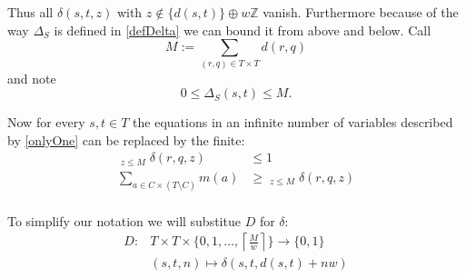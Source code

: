 \documentclass[a4paper]{amsart} %
\begin{document}
Thus all \(\delta (s, t, z)\) with \(z \notin \{d (s,t)\} \oplus w \mathbb{Z}\) vanish.  Furthermore because of the way \(\Delta_S\) is defined in \ref{defDelta} we can bound it from above and below. Call
\[M := \sum_{(r,q) \in T \times T} d (r,q)\]
and note
\[0 \leq \Delta_S(s,t) \leq M \textrm{.}\]


Now for every \(s,t \in T\) the equations in an infinite number of variables described by \ref{onlyOne} can be replaced by the finite:
\begin{align}
  \label{onlyOneFinite}
  \mathop{\sum_{z \in \left\{d (s,t)\right\} \oplus w \mathbb{N}_0}}_{z\leq M} \delta(r, q, z) & \leq 1 \\
  \label{zwingRunterFinite}
  \sum_{a \in C \times (T \setminus C)} m(a) & \geq \mathop{\sum_{z \in \left\{d (s,t)\right\} \oplus w \mathbb{N}_0}}_{z\leq M} \delta (r,q, z) \\
\end{align}

To simplify our notation we will substitue \(D\) for \(\delta\):
\begin{align}
  D \colon & T \times T \times \{0, 1, \dots,  \left\lceil \frac{M}{w} \right\rceil \}  \to \{0,1\} \\
          & (s,       t,        n)                              \mapsto \delta (s,t, d(s,t) + n w)
\end{align}
\end{document}
